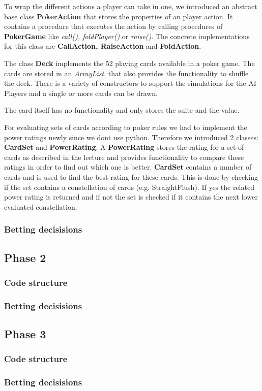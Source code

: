 To wrap the different actions a player can take in one, we introduced an abstract base class \textbf{PokerAction} that stores the properties of an player action. It contains a procedure that executes the action by calling procedures of \textbf{PokerGame} like \textit{call(), foldPlayer()} or \textit{raise()}.
The concrete implementations for this class are \textbf{CallAction, RaiseAction} and \textbf{FoldAction}.

The class \textbf{Deck} implements the 52 playing cards available in a poker game. The cards are stored in an \textit{ArrayList}, that also provides the functionality to shuffle the deck. There is a variety of constructors to support the simulations for the AI Players and a single or more cards can be drawn.

The card itself has no functionality and only stores the suite and the value.

For evaluating sets of cards according to poker rules we had to implement the power ratings newly since we dont use python. Therefore we introduced 2 classes: \textbf{CardSet} and \textbf{PowerRating}.
A \textbf{PowerRating} stores the rating for a set of cards as described in the lecture and provides functionality to compare these ratings in order to find out which one is better.
\textbf{CardSet} contains a number of cards and is used to find the best rating for these cards.
This is done by checking if the set contains a constellation of cards (e.g. StraightFlush). If yes the related power rating is returned and if not the set is checked if it contains the next lower evaluated constellation.

\subsubsection{Betting decisisions}






\subsection{Phase 2}

\subsubsection{Code structure}

\subsubsection{Betting decisisions}

\subsection{Phase 3}

\subsubsection{Code structure}

\subsubsection{Betting decisisions}


